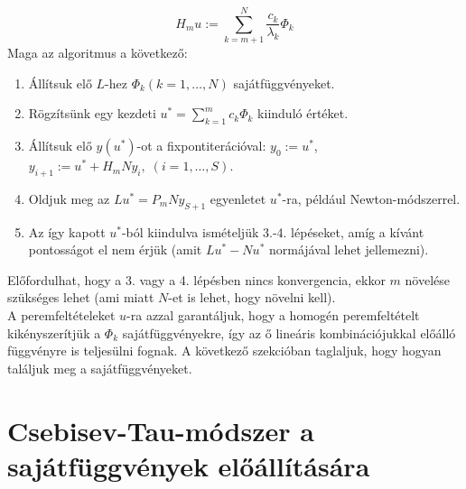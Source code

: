 \documentclass[oneside, titlepage, 12pt, a4paper]{report}
\begin{document}
\begin{equation*}
H_m u := \sum_{k = m+1}^N \frac{c_k}{\lambda_k} \Phi_k
\end{equation*}
Maga az algoritmus a következő:
\begin{enumerate}
\item Állítsuk elő $L$-hez $\Phi_k (k = 1, \dots, N)$ sajátfüggvényeket.
\item Rögzítsünk egy kezdeti $u^* = \sum_{k = 1}^m c_k \Phi_k$ kiinduló értéket.
\item Állítsuk elő $y(u^*)$-ot a fixpontiterációval: $y_0 := u^*$, $y_{i+1} := u^* + H_m N y_i, \; (i = 1, \dots, S)$.
\item Oldjuk meg az $Lu^* = P_m N y_{S+1}$ egyenletet $u^*$-ra, például Newton-módszerrel.
\item Az így kapott $u^*$-ból kiindulva ismételjük 3.-4. lépéseket, amíg a kívánt pontosságot el nem érjük (amit $Lu^* - Nu^*$ normájával lehet jellemezni).
\end{enumerate}
Előfordulhat, hogy a 3. vagy a 4. lépésben nincs konvergencia, ekkor $m$ növelése szükséges lehet (ami miatt $N$-et is lehet, hogy növelni kell). \\
A peremfeltételeket $u$-ra azzal garantáljuk, hogy a homogén peremfeltételt kikényszerítjük a $\Phi_k$ sajátfüggvényekre, így az ő lineáris kombinációjukkal előálló függvényre is teljesülni fognak. A következő szekcióban taglaljuk, hogy hogyan találjuk meg a sajátfüggvényeket.

\section{Csebisev-Tau-módszer a sajátfüggvények előállítására}
\label{sec:ChebTau}
\end{document}
